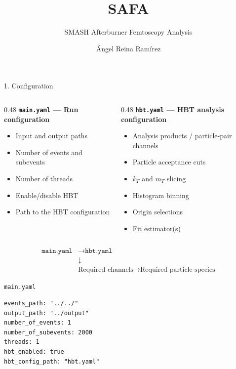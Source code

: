 \documentclass{beamer}
\title{SAFA}
\subtitle{SMASH Afterburner Femtoscopy Analysis}
\author{Ángel Reina Ramírez}
\date{}
\begin{document}
\begin{frame}
    \titlepage
\end{frame}


\begin{frame}{1. Configuration}

\begin{columns}[T]

\begin{column}{0.48\textwidth}
\textbf{\texttt{main.yaml} --- Run configuration}

\begin{itemize}
    \item Input and output paths
    \item Number of events and subevents
    \item Number of threads
    \item Enable/disable HBT
    \item Path to the HBT configuration
\end{itemize}
\end{column}

\begin{column}{0.48\textwidth}
\textbf{\texttt{hbt.yaml} --- HBT analysis configuration}

\begin{itemize}
    \item Analysis products / particle-pair channels
    \item Particle acceptance cuts
    \item $k_T$ and $m_T$ slicing
    \item Histogram binning
    \item Origin selections
    \item Fit estimator(s)
\end{itemize}
\end{column}

\end{columns}

\vfill

\[
\begin{aligned}
\texttt{main.yaml} &\longrightarrow \texttt{hbt.yaml} \\
& \downarrow \\
& \boxed{\text{Required channels}}
\longrightarrow
\boxed{\text{Required particle species}}
\end{aligned}
\]

\end{frame}

\begin{frame}[fragile]{\texttt{main.yaml}}
\footnotesize
\begin{verbatim}
events_path: "../../"
output_path: "../output"
number_of_events: 1
number_of_subevents: 2000
threads: 1
hbt_enabled: true
hbt_config_path: "hbt.yaml"
\end{verbatim}
\end{frame}
\end{document}
